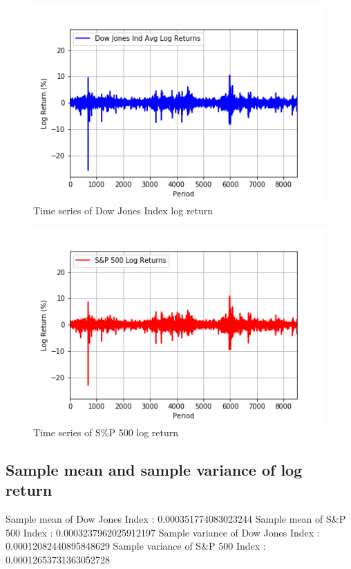\documentclass[a4paper]{article}
\begin{document}
\begin{figure}[h!]
	\includegraphics[width=\linewidth]{DJI_logret.png}
	\caption{Time series of Dow Jones Index log return}
\end{figure}
\begin{figure}[h!]
	\includegraphics[width=\linewidth]{SP_logret.png}
	\caption{Time series of S\%P 500 log return}
\end{figure}

\subsection{Sample mean and sample variance of log return}
\begin{flushleft}
Sample mean of Dow Jones Index : 0.000351774083023244  \linebreak 
Sample mean of S\&P 500 Index : 0.0003237962025912197  \linebreak 
Sample variance of Dow Jones Index : 0.00012082440895848629  \linebreak 
Sample variance of S\&P 500 Index : 0.00012653731363052728  \linebreak 
\end{flushleft}
\end{document}
